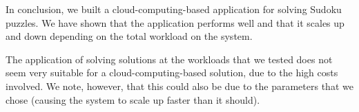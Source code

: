 In conclusion, we built a cloud-computing-based application for solving Sudoku puzzles.
We have shown that the application performs well and that it scales up and down depending on the total workload on the system.

The application of solving solutions at the workloads that we tested does not seem very suitable for a cloud-computing-based solution, due to the high costs involved.
We note, however, that this could also be due to the parameters that we chose (causing the system to scale up faster than it should).
